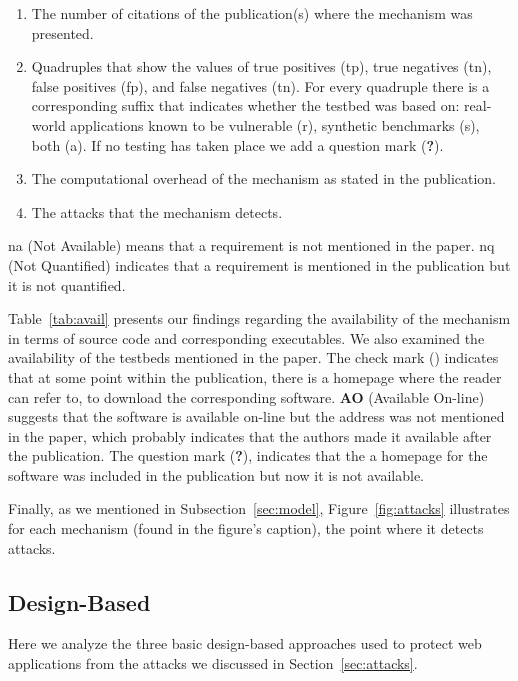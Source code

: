 \documentclass[conference]{IEEEtran}
\newcommand{\tick}{\ding{52}}
\begin{document}
\begin{enumerate}
\item The number of citations of the publication(s) where
the mechanism was presented.
\item Quadruples that show the values of true
positives ({\sc tp}), true negatives ({\sc tn}),
false positives ({\sc fp}), and false negatives
({\sc tn}). For every quadruple there is a corresponding
suffix that indicates whether the testbed was based
on: real-world applications known to be vulnerable
(r), synthetic benchmarks (s), both (a).
If no testing has taken place we add a question
mark ({\bf ?}).
\item The computational overhead of the
mechanism as stated in the publication.
\item The attacks that the mechanism detects.
\end{enumerate}

\noindent
{\sc na} (Not Available) means that a requirement is not
mentioned in the paper. {\sc nq} (Not Quantified)
indicates that a requirement is mentioned in the publication
but it is not quantified.

Table~\ref{tab:avail} presents
our findings regarding the availability of the mechanism
in terms of source code and corresponding executables.
We also examined the availability of the testbeds mentioned in the paper.
The check mark (\tick) indicates that at some point within the publication,
there is a homepage where the reader can refer to, to download the
corresponding software. {\bf AO} (Available On-line) suggests that
the software is available on-line but the address was not mentioned
in the paper, which probably indicates that the authors made
it available after the publication. The question mark ({\bf ?}),
indicates that the a homepage for the software was included
in the publication but now it is not available.

Finally, as we mentioned in Subsection~\ref{sec:model},
Figure~\ref{fig:attacks} illustrates for each mechanism
(found in the figure's caption), the point where
it detects attacks.

\subsection{Design-Based}
\label{sec:prot}

Here we analyze the three basic design-based approaches
used to protect web applications from the attacks we
discussed in Section~\ref{sec:attacks}.
\end{document}
